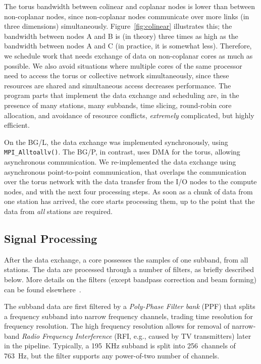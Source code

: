 \documentclass{sig-alternate}
\begin{document}
The torus bandwidth between colinear and coplanar nodes is lower than between
non-coplanar nodes, since non-coplanar nodes communicate over more links
(in three dimensions) simultaneously.
Figure~\ref{fig:colinear} illustrates this; the bandwidth between nodes
\textsf{A} and \textsf{B} is (in theory) three times as high as the bandwidth
between nodes \textsf{A} and \textsf{C} (in practice, it is somewhat less).
Therefore, we schedule work that needs exchange of data 
on non-coplanar cores as much as possible.
We also avoid situations where multiple cores of the same processor need to
access the torus or collective network simultaneously, since these resources
are shared and simultaneous access decreases performance.
The program parts that implement the data exchange and scheduling are, in the
presence of many stations, many subbands, time slicing, round-robin core
allocation, and avoidance of resource conflicts, \emph{extremely\/}
complicated, but highly efficient.

On the BG/L, the data exchange was implemented synchronously, using
\texttt{MPI\_Alltoallv()}.
The BG/P, in contrast, uses DMA for the torus, allowing asynchronous
communication.
We re-implemented the data exchange using asynchronous point-to-point
communication, that overlaps the communication over the torus network with 
the data transfer from the I/O nodes to the compute nodes, and with
the next four processing steps.
As soon as a chunk of data from one station has arrived, the core starts
processing them, up to the point that the data from \emph{all\/} stations
are required.


\subsection{Signal Processing}
\label{sec:signal-processing}

After the data exchange, a core possesses the samples of one subband, from all
stations.
The data are processed through a number of filters, as briefly described below.
More details on the filters (except bandpass correction and beam forming)
can be found elsewhere~\cite{Romein:06}.

The subband data are first filtered by a \emph{Poly-Phase Filter bank\/} (PPF) that
splits a frequency subband into narrow frequency channels, trading time
resolution for frequency resolution.
The high frequency resolution allows for removal of narrow-band
\emph{Radio Frequency Interference\/} (RFI, e.g., caused by TV transmitters)
later in the pipeline.
Typically, a 195~KHz subband is split into 256~channels of 763~Hz, but the
filter supports any power-of-two number of channels.
\end{document}
